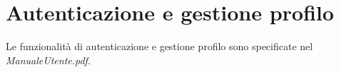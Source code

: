 \section{Autenticazione e gestione profilo}
	Le funzionalità di autenticazione e gestione profilo sono specificate nel \emph{ManualeUtente.pdf}.